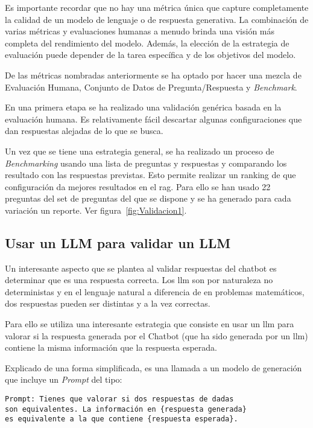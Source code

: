 Es importante recordar que no hay una métrica única que capture completamente la calidad de un modelo de lenguaje o de respuesta generativa. La combinación de varias métricas y evaluaciones humanas a menudo brinda una visión más completa del rendimiento del modelo. Además, la elección de la estrategia de evaluación puede depender de la tarea específica y de los objetivos del modelo.

De las métricas nombradas anteriormente se ha optado por hacer una mezcla de Evaluación Humana, Conjunto de Datos de Pregunta/Respuesta y \textit{Benchmark}. 

En una primera etapa se ha realizado una validación genérica basada en la evaluación humana. Es relativamente fácil descartar algunas configuraciones que dan respuestas alejadas de lo que se busca.

Un vez que se tiene una estrategia general, se ha realizado un proceso de \textit{Benchmarking} usando una lista de preguntas y respuestas y comparando los resultado con las respuestas previstas. Esto permite realizar un ranking de que configuración da mejores resultados en el \acrshort{rag}. Para ello se han usado 22 preguntas del set de preguntas del que se dispone y se ha generado para cada variación un reporte. Ver figura~\ref{fig:Validacion1}.


\subsection{Usar un LLM para validar un LLM}

Un interesante aspecto que se plantea al validar respuestas del chatbot es determinar que es una respuesta correcta. Los \acrshort{llm} son por naturaleza no deterministas y en el lenguaje natural a diferencia de en problemas matemáticos, dos respuestas pueden ser distintas y a la vez correctas. 

Para ello se utiliza una interesante estrategia que consiste en usar un \acrshort{llm} para valorar si la respuesta generada por el Chatbot (que ha sido generada por un \acrshort{llm}) contiene la misma información que la respuesta esperada.

Explicado de una forma simplificada, es una llamada a un modelo de generación que incluye un \textit{Prompt} del tipo:

\begin{verbatim}
Prompt: Tienes que valorar si dos respuestas de dadas 
son equivalentes. La información en {respuesta generada} 
es equivalente a la que contiene {respuesta esperada}.
\end{verbatim}

